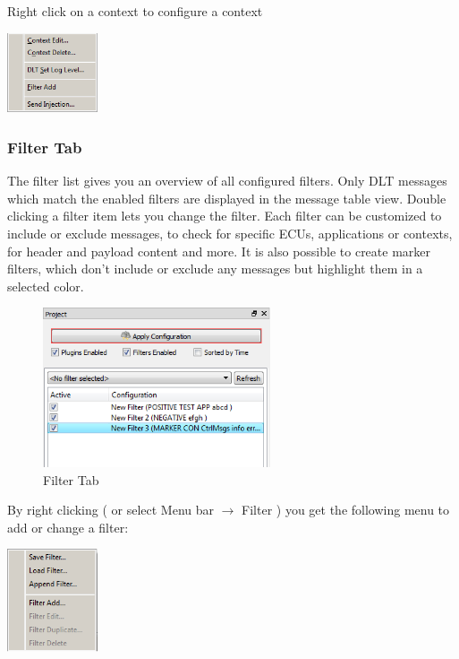 \documentclass[a4paper,11pt]{article}
\begin{document}
\vspace{0.1cm}

Right click on a context to configure a context\linebreak

\vspace{0.1cm}

\includegraphics[width=0.2\textwidth]{images/ctx_context_menu.png}

\vspace{0.1cm}


\subsubsection{Filter Tab}
The filter list gives you an overview of all configured filters. Only DLT messages which match the enabled filters are displayed in the message table view.
Double clicking a filter item lets you change the filter. Each filter can be customized to include or exclude messages, to check for
specific ECUs, applications or contexts, for header and payload content and more. It is also possible to create marker filters, which don't
include or exclude any messages but highlight them in a selected color.


\begin{figure}[H]
 \centering
 \includegraphics[width=0.6\textwidth]{images/filter_widget.png}
 \caption{Filter Tab}
 \label{fig:filtertab}
\end{figure}


By right clicking ( or select Menu bar \ensuremath{\rightarrow} Filter ) you get the following menu to add or change a filter:

\vspace{0.1cm}
\includegraphics[width=0.2\textwidth]{images/filter_context_menu.png}
\linebreak
\end{document}
